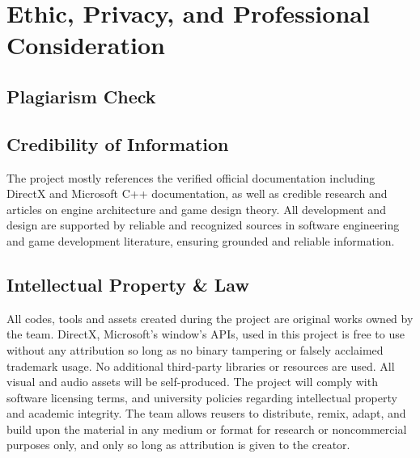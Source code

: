 \section{Ethic, Privacy, and Professional Consideration}
\label{sec:ethic-privacy-and-professional-consideration}

\subsection{Plagiarism Check}
\label{subsec:plagiarism-check}

\subsection{Credibility of Information}
\label{subsec:credibility-of-information}

The project mostly references the verified official documentation including DirectX and Microsoft C++ documentation,
as well as credible research and articles on engine architecture and game design theory.
All development and design are supported by reliable and recognized sources in software engineering and game development literature,
ensuring grounded and reliable information.

\subsection{Intellectual Property \& Law}
\label{subsec:intellectual-property-and-law}

All codes, tools and assets created during the project are original works owned by the team.
DirectX, Microsoft's window’s APIs, used in this project is free to use without any attribution so long as no binary tampering or falsely acclaimed trademark usage.
No additional third-party libraries or resources are used.
All visual and audio assets will be self-produced.
The project will comply with software licensing terms, and university policies regarding intellectual property and academic integrity.
The team allows reusers to distribute, remix, adapt, and build upon the material in any medium or format for research or noncommercial purposes only,
and only so long as attribution is given to the creator.
